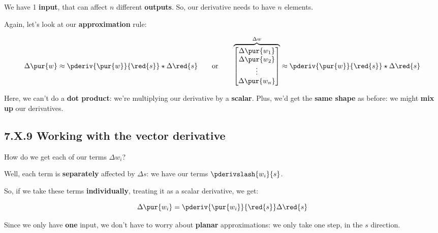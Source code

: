         We have 1 \textbf{input}, that can affect $n$ different \textbf{outputs}. So, our derivative needs to have $n$ elements.
        
        Again, let's look at our \textbf{approximation} rule:
        
        \begin{equation}
            \Delta \pur{w}
            \approx
            \pderiv{ \pur{w} }{ \red{s} }  
            \star
            \Delta \red{s}
                \qquad
                \text{or}
                \qquad
            \overbrace{
                \begin{bmatrix}
                    \Delta \pur{w_1}\\ \Delta \pur{w_2}\\ \vdots \\ \Delta \pur{w_n}
                \end{bmatrix}
            }^{\Delta w}
            \approx
            \pderiv{ \pur{w} }{ \red{s} } 
            \star
            \Delta \red{s}
        \end{equation}
        
        Here, we can't do a \textbf{dot product}: we're multiplying our derivative by a \textbf{scalar}. Plus, we'd get the \textbf{same shape} as before: we might \textbf{mix up} our derivatives.
    
    \secdiv
    
    \subsection*{7.X.9 \quad Working with the vector derivative}   
        
        How do we get each of our terms $\Delta w_i$?
        
        Well, each term is \textbf{separately} affected by $\Delta s$: we have our terms $\pderivslash{w_i}{s}$.
        
        So, if we take these terms \textbf{individually}, treating it as a scalar derivative, we get:
            
        \begin{equation}
            \Delta \pur{w_i} = \pderiv{\pur{w_i}}{\red{s}} \Delta \red{s}
        \end{equation}
        
        Since we only have \textbf{one} input, we don't have to worry about \textbf{planar} approximations: we only take one step, in the $s$ direction.
        
